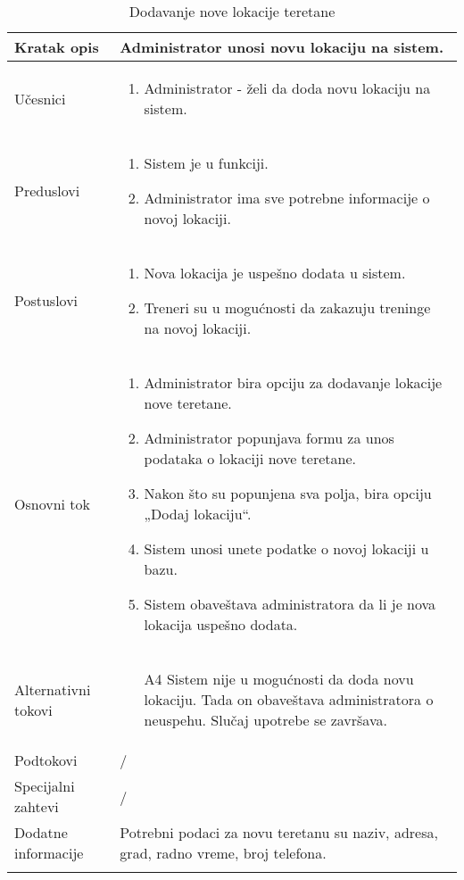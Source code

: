 \documentclass[../main.tex]{subfiles}
\begin{document}
\begin{longtable}{| p{} | p{} |} 

\hline
    Kratak opis &  Administrator unosi novu lokaciju na sistem.\\ 
\hline    
    Učesnici & 
    	\begin{enumerate}
        \item Administrator - želi da doda novu lokaciju na sistem.
     \end{enumerate}\\
\hline
   Preduslovi & \begin{enumerate}
       \item Sistem je u funkciji.
       \item Administrator ima sve potrebne informacije o novoj lokaciji.
   \end{enumerate}\\
\hline  
    Postuslovi & \begin{enumerate}
        \item Nova lokacija je uspešno dodata u sistem.
        \item Treneri su u mogućnosti da zakazuju treninge na novoj lokaciji.
    \end{enumerate}\\
\hline
    Osnovni tok & \begin{enumerate}
        \item Administrator bira opciju za dodavanje lokacije nove teretane.
        \item Administrator popunjava formu za unos podataka o lokaciji nove teretane.
        \item Nakon što su popunjena sva polja, bira opciju „Dodaj lokaciju“.
        \item Sistem unosi unete podatke o novoj lokaciji u bazu.
        \item Sistem obaveštava administratora da li je nova lokacija uspešno dodata.
    \end{enumerate}\\
\hline
    Alternativni tokovi & \begin{itemize}
        \item[A4]  Sistem nije u mogućnosti da doda novu lokaciju. Tada on obaveštava administratora o neuspehu. Slučaj upotrebe se završava.

    \end{itemize}\\
\hline
    Podtokovi & /\\
\hline
    Specijalni zahtevi & /\\
\hline
    Dodatne informacije & Potrebni podaci za novu teretanu su naziv, adresa, grad, radno vreme, broj telefona.\\
\hline
\caption{Dodavanje nove lokacije teretane} %
\end{longtable}
\end{document}
